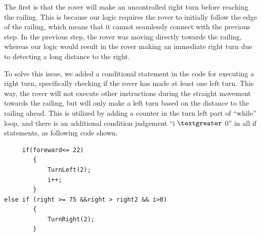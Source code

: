 \documentclass[12pt, a4paper, oneside]{report}
\begin{document}
The first is that the rover will make an uncontrolled right turn before reaching the railing. This is because our logic requires the rover to initially follow the edge of the railing, which means that it cannot seamlessly connect with the previous step. In the previous step, the rover was moving directly towards the railing, whereas our logic would result in the rover making an immediate right turn due to detecting a long distance to the right.

To solve this issue, we added a conditional statement in the code for executing a right turn, specifically checking if the rover has made at least one left turn. This way, the rover will not execute other instructions during the straight movement towards the railing, but will only make a left turn based on the distance to the railing ahead. This is utilized by adding a counter in the turn left part of “while” loop, and there is an additional condition judgement “i $\textgreater$ 0” in all if statements, as following code shown.

\begin{lstlisting}
     if(foreward<= 22)
        {     
            TurnLeft(2);
            i++;     
        }
else if (right >= 75 &&right > right2 && i>0) 
        {
            TurnRight(2);
        }

\end{lstlisting}
\end{document}
